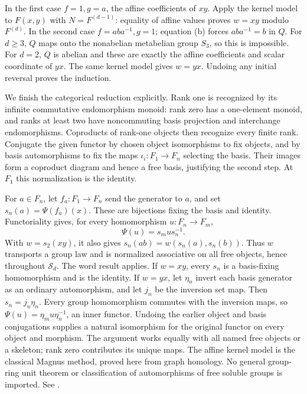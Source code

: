 In the first case \(f=1,g=a\), the affine coefficients of \(xy\).
Apply the kernel model to \(F(x,y)\) with \(N=F^{(d-1)}\):
equality of affine values proves \(w=xy\) modulo \(F^{(d)}\).
In the second case \(f=aba^{-1},g=1\); equation (b) forces
\(aba^{-1}=b\) in \(Q\).
For \(d\ge3\), \(Q\) maps onto the nonabelian metabelian group \(S_3\),
so this is impossible. For \(d=2\), \(Q\) is abelian and these are
exactly the affine coefficients and scalar coordinate of \(yx\).
The same kernel model gives \(w=yx\).
Undoing any initial reversal proves the induction.

We finish the categorical reduction explicitly.
Rank one is recognized by its infinite commutative endomorphism
monoid: rank zero has a one-element monoid, and ranks at least two
have noncommuting basis projection and interchange endomorphisms.
Coproducts of rank-one objects then recognize every finite rank.
Conjugate the given functor by chosen object isomorphisms to fix
objects, and by basis automorphisms to fix the maps
\(\iota_i:F_1\to F_n\) selecting the basis. Their images form a
coproduct diagram and hence a free basis, justifying the second step.
At \(F_1\) this normalization is the identity.

For \(a\in F_n\), let \(f_a:F_1\to F_n\) send the generator to \(a\),
and set \(s_n(a)=\Psi(f_a)(x)\).
These are bijections fixing the basis and identity.
Functoriality gives, for every homomorphism \(u:F_n\to F_m\),
\[
 \Psi(u)=s_mus_n^{-1}.
\]
With \(w=s_2(xy)\), it also gives
\(s_n(ab)=w(s_n(a),s_n(b))\).
Thus \(w\) transports a group law and is normalized associative on
all free objects, hence throughout \(\mathcal S_d\).
The word result applies.
If \(w=xy\), every \(s_n\) is a basis-fixing homomorphism and is
the identity. If \(w=yx\), let \(\eta_n\) invert each basis generator
as an ordinary automorphism, and let \(j_n\) be the inversion set map.
Then \(s_n=j_n\eta_n\).
Every group homomorphism commutes with the inversion maps, so
\(\Psi(u)=\eta_mu\eta_n^{-1}\), an inner functor.
Undoing the earlier object and basis conjugations supplies a natural
isomorphism for the original functor on every object and morphism.
The argument works equally with all named free objects or a skeleton;
rank zero contributes its unique maps.
The affine kernel model is the classical Magnus method, proved here
from graph homology. No general group-ring unit theorem or classification
of automorphisms of free soluble groups is imported.
See .
